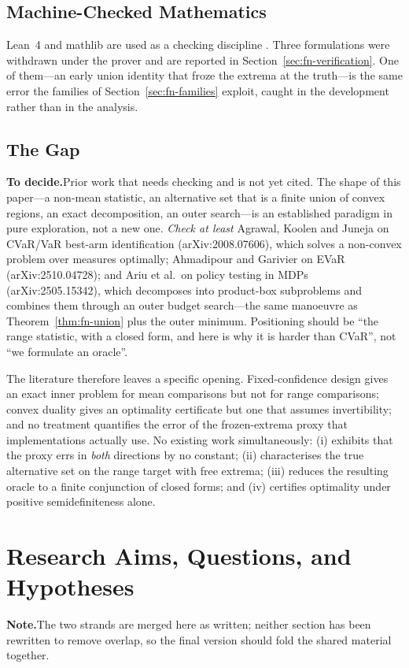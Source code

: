 \documentclass[conference]{IEEEtran}
\theoremstyle{definition}
\newif\ifshownotes\shownotestrue
\newcommand{\NOTEPAR}[1]{\ifshownotes\par\vspace{2pt}\noindent%
  {\color{notecol}\textsf{\footnotesize\textbf{Note.}\;#1}}\par\vspace{2pt}\fi}
\newcommand{\TODOPAR}[1]{\ifshownotes\par\vspace{2pt}\noindent%
  {\color{todocol}\textsf{\footnotesize\textbf{To decide.}\;#1}}\par\vspace{2pt}\fi}
\begin{document}
\subsection{Machine-Checked Mathematics}

Lean~4 and mathlib are used as a checking discipline \cite{demoura2021,mathlib2020}. Three
formulations were withdrawn under the prover and are reported in
Section~\ref{sec:fn-verification}. One of them---an early union identity that froze the extrema
at the truth---is the same error the families of Section~\ref{sec:fn-families} exploit, caught
in the development rather than in the analysis.

\subsection{The Gap}
\TODOPAR{Prior work that needs checking and is not yet cited. The shape of this
paper---a non-mean statistic, an alternative set that is a finite union of convex regions,
an exact decomposition, an outer search---is an established paradigm in pure exploration, not
a new one. \emph{Check at least} Agrawal, Koolen and Juneja on CVaR/VaR best-arm
identification (arXiv:2008.07606), which solves a non-convex problem over measures optimally;
Ahmadipour and Garivier on EVaR (arXiv:2510.04728); and Ariu et al.\ on policy testing in
MDPs (arXiv:2505.15342), which decomposes into product-box subproblems and combines them
through an outer budget search---the same manoeuvre as Theorem~\ref{thm:fn-union} plus the
outer minimum. Positioning should be ``the range statistic, with a closed form, and here is
why it is harder than CVaR'', not ``we formulate an oracle''.}

The literature therefore leaves a specific opening. Fixed-confidence design gives an exact
inner problem for mean comparisons but not for range comparisons; convex duality gives an
optimality certificate but one that assumes invertibility; and no treatment quantifies the
error of the frozen-extrema proxy that implementations actually use. No existing work
simultaneously: (i) exhibits that the proxy errs in \emph{both} directions by no constant;
(ii) characterises the true alternative set on the range target with free extrema;
(iii) reduces the resulting oracle to a finite conjunction of closed forms; and
(iv) certifies optimality under positive semidefiniteness alone.


\section{Research Aims, Questions, and Hypotheses}
\NOTEPAR{The two strands are merged here as written; neither section has been rewritten to remove overlap, so the final version should fold the shared material together.}
\end{document}
